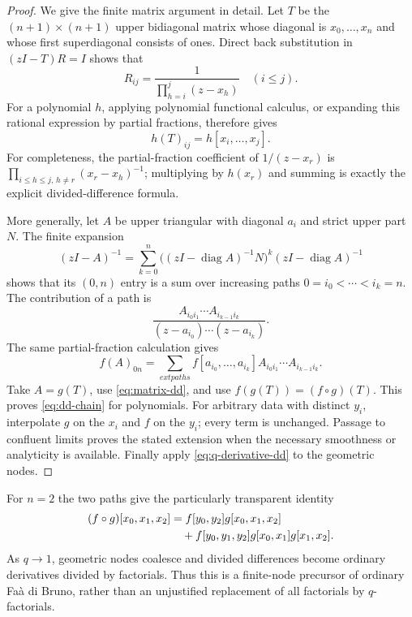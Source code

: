 \documentclass[11pt,a4paper]{article}
\numberwithin{equation}{section}
\theoremstyle{definition}
\theoremstyle{remark}
\begin{document}
\begin{proof}
We give the finite matrix argument in detail. Let $T$ be the
$(n+1)\times(n+1)$ upper bidiagonal matrix whose diagonal is
$x_0,\ldots,x_n$ and whose first superdiagonal consists of ones. Direct
back substitution in $(zI-T)R=I$ shows that
\[
 R_{ij}=\frac1{\prod_{h=i}^j(z-x_h)}\quad(i\le j).
\]
For a polynomial $h$, applying polynomial functional calculus, or
expanding this rational expression by partial fractions, therefore gives
\begin{equation}
 h(T)_{ij}=h[x_i,\ldots,x_j].
 \label{eq:matrix-dd}
\end{equation}
For completeness, the partial-fraction coefficient of $1/(z-x_r)$ is
$\prod_{i\le h\le j,\,h\ne r}(x_r-x_h)^{-1}$; multiplying by $h(x_r)$
and summing is exactly the explicit divided-difference formula.

More generally, let $A$ be upper triangular with diagonal $a_i$ and
strict upper part $N$. The finite expansion
\[
 (zI-A)^{-1}
 =\sum_{k=0}^n\bigl((zI-\operatorname{diag}A)^{-1}N\bigr)^k
                (zI-\operatorname{diag}A)^{-1}
\]
shows that its $(0,n)$ entry is a sum over increasing paths
$0=i_0<\cdots<i_k=n$. The contribution of a path is
\[
 \frac{A_{i_0i_1}\cdots A_{i_{k-1}i_k}}
      {(z-a_{i_0})\cdots(z-a_{i_k})}.
\]
The same partial-fraction calculation gives
\[
 f(A)_{0n}=\sum_{	ext{paths}}
       f[a_{i_0},\ldots,a_{i_k}]
       A_{i_0i_1}\cdots A_{i_{k-1}i_k}.
\]
Take $A=g(T)$, use \cref{eq:matrix-dd}, and use
$f(g(T))=(f\circ g)(T)$. This proves \cref{eq:dd-chain} for
polynomials. For arbitrary data with distinct $y_i$, interpolate $g$
on the $x_i$ and $f$ on the $y_i$; every term is unchanged. Passage to
confluent limits proves the stated extension when the necessary
smoothness or analyticity is available. Finally apply
\cref{eq:q-derivative-dd} to the geometric nodes.
\end{proof}

For $n=2$ the two paths give the particularly transparent identity
\begin{align}
 (f\circ g)[x_0,x_1,x_2]
 &=f[y_0,y_2]g[x_0,x_1,x_2] \notag\\
 &\quad+f[y_0,y_1,y_2]g[x_0,x_1]g[x_1,x_2].
 \label{eq:dd-chain-two}
\end{align}
As $q\to1$, geometric nodes coalesce and divided differences become
ordinary derivatives divided by factorials. Thus this is a finite-node
precursor of ordinary Fa\`a di Bruno, rather than an unjustified
replacement of all factorials by $q$-factorials.
\end{document}
